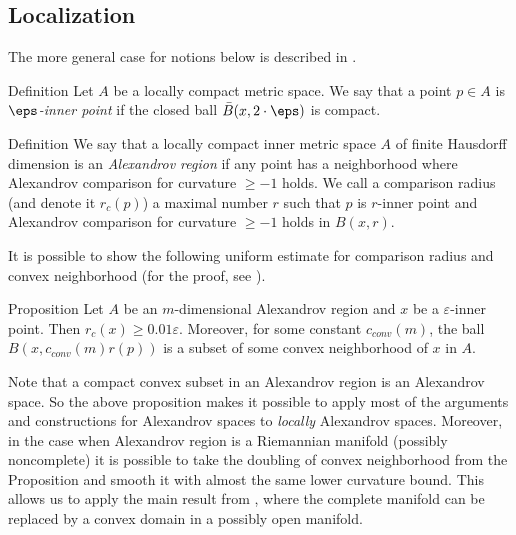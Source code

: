 \subsection{Localization}\label{sec:local}

The more general case for notions below is described in \cite{LNep}.

\begin{rdef}{Definition}
Let $A$ be a locally compact metric space. 
We say that a point  $p\in A$
is  \emph{ $\eps$-inner point} if
the closed ball $\bar B(x,2\cdot\eps)$ is compact.

\end{rdef}

\begin{rdef}{Definition}
We say that
 a locally compact inner metric space $A$ of finite Hausdorff dimension
is an \emph{ Alexandrov region} if
any point has a neighborhood where Alexandrov
comparison for curvature $\ge -1$ holds.
We call a comparison 
radius (and denote it $r_c(p)$) a maximal number $r$ such that
$p$ is $r$-inner point and 
 Alexandrov
comparison for curvature $\ge -1$ holds in
$B(x,r)$.


\end{rdef}
It is possible to show the following uniform estimate for
comparison radius and convex neighborhood (for the proof, see \cite{LNep}).

\begin{thm}{Proposition}
Let $A$ be an $m$-dimensional Alexandrov region
and $x$ be a $\varepsilon$-inner
point. Then 
 $r_c(x)\ge 0.01\varepsilon$.
Moreover,  for some constant $c_{conv}(m)$,
the ball $B(x, c_{conv}(m)r(p))$ is a subset of some
convex
neighborhood of $x$ in $A$.

\end{thm}

Note that a compact convex subset in an Alexandrov region is an Alexandrov space.
So the above proposition
makes it possible 
to apply most of the arguments and constructions for Alexandrov spaces to
 \emph{locally} Alexandrov spaces. 
  Moreover, in the case when Alexandrov region
  is a Riemannian 
manifold (possibly noncomplete) it is possible
to take the doubling of convex neighborhood from the Proposition
and smooth it with almost the same lower curvature bound.
This allows us to apply the main result from
 \cite{petrunin-SC}, where the complete manifold can be replaced by a convex domain  in a possibly open manifold. 

